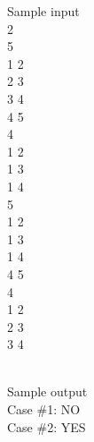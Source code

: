    Sample input   
\\   2   
\\   5   
\\   1 2   
\\   2 3   
\\   3 4   
\\   4 5   
\\   4   
\\   1 2   
\\   1 3   
\\   1 4   
\\   5   
\\   1 2   
\\   1 3   
\\   1 4   
\\   4 5   
\\   4   
\\   1 2   
\\   2 3   
\\   3 4  


\\   Sample output   
\\   Case \#1: NO   
\\   Case \#2: YES  